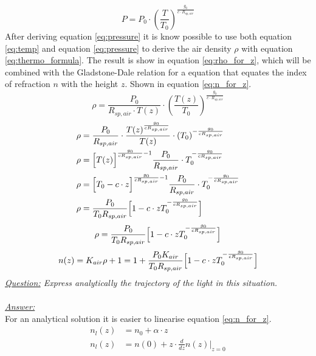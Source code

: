 \documentclass{article}
\begin{document}
\begin{equation}
	P = P_0 \cdot (\frac{T}{T_0})^{\frac{g_0}{c\cdot R_{sp,air}}}
	\label{eq:pressure}
\end{equation}
After deriving equation \ref{eq:pressure} it is know possible to use both equation \ref{eq:temp} and equation \ref{eq:pressure} to derive the air density $\rho$ with equation \ref{eq:thermo_formula}. The result is show in equation \ref{eq:rho_for_z}, which will be combined with the Gladstone-Dale relation for a equation that equates the index of refraction $n$ with the height $z$. Shown in equation \ref{eq:n_for_z}.\\
\begin{equation*}
	\rho = \frac{P_0}{R_{sp,air}\cdot T(z)} \cdot(\frac{T(z)}{T_0})^{\frac{g_0}{c\cdot R_{sp,air}}}
\end{equation*}
\begin{align*}
	\rho &= \frac{P_0}{R_{sp,air}} \cdot \frac{T(z)^{\frac{g_0}{c R_{sp,air}}}}{T(z)} \cdot (T_0)^{-\frac{g_0}{c R_{sp,air}}}\\
	\rho &= \Bigl[T(z) \Bigr]^{\frac{g_0}{c R_{sp,air}} -1} \frac{P_0}{R_{sp,air}} \cdot T_0^{-\frac{g_0}{c R_{sp,air}}}\\
	\rho &= \Bigl[T_0 -c\cdot z \Bigr]^{\frac{g_0}{c R_{sp,air}} -1} \frac{P_0}{R_{sp,air}} \cdot T_0^{-\frac{g_0}{c R_{sp,air}}}\\
	\rho &= \frac{P_0}{T_0 R_{sp,air}} \Bigl[1-c\cdot z T_0^{-\frac{g_0}{c R_{sp,air}}}\Bigr]
\end{align*}
\begin{equation}
	\rho = \frac{P_0}{T_0 R_{sp,air}} \Bigl[1-c\cdot z T_0^{-\frac{g_0}{c R_{sp,air}}}\Bigr]
	\label{eq:rho_for_z}
\end{equation}
\begin{equation}
	n(z) = K_{air}\rho + 1 = 1 + \frac{P_0 K_{air}}{T_0 R_{sp,air}} \Bigl[1-c\cdot z T_0^{-\frac{g_0}{c R_{sp,air}}}\Bigr]
	\label{eq:n_for_z}
\end{equation}
\textit{\underline{Question:} Express analytically the trajectory of the light in this situation.}\\
\\
\textit{\underline{Answer:}} \\
For an analytical solution it is easier to linearise equation \ref{eq:n_for_z}.
\begin{align*}
	n_l(z) &= n_0 + \alpha \cdot z\\
	n_l(z) &= n(0) +z \cdot \frac{d}{dz}n(z)\rvert_{z=0}
\end{align*}
\end{document}
